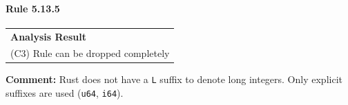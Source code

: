 \paragraph{Rule 5.13.5}
\begin{longtable}{p{13cm}}
\textbf{Analysis Result} \\
(C3) Rule can be dropped completely \\
\end{longtable}
\textbf{Comment:} Rust does not have a \texttt{L} suffix to denote long integers. Only explicit suffixes are used (\texttt{u64}, \texttt{i64}). \\


